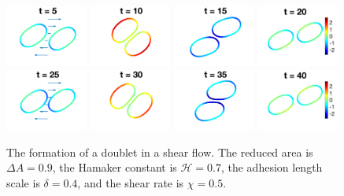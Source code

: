 \documentclass[prf,superscriptaddress,showpacs]{revtex4-1}
\begin{document}
\begin{figure}[htp]
  \includegraphics[width=0.24\textwidth]{figs/adR4em1adS7em1Chi5em1_ra090_image01.png}
  \includegraphics[width=0.24\textwidth]{figs/adR4em1adS7em1Chi5em1_ra090_image02.png}
  \includegraphics[width=0.24\textwidth]{figs/adR4em1adS7em1Chi5em1_ra090_image03.png}
  \includegraphics[width=0.24\textwidth]{figs/adR4em1adS7em1Chi5em1_ra090_image04.png}
  \includegraphics[width=0.24\textwidth]{figs/adR4em1adS7em1Chi5em1_ra090_image05.png}
  \includegraphics[width=0.24\textwidth]{figs/adR4em1adS7em1Chi5em1_ra090_image06.png}
  \includegraphics[width=0.24\textwidth]{figs/adR4em1adS7em1Chi5em1_ra090_image07.png}
  \includegraphics[width=0.24\textwidth]{figs/adR4em1adS7em1Chi5em1_ra090_image08.png}
  \caption{\label{fig:doublet090} The formation of a doublet in a shear
  flow.  The reduced area is $\Delta A = 0.9$, the Hamaker constant is
  $\mathcal{H}=0.7$, the adhesion length scale is $\delta = 0.4$, and
  the shear rate is $\chi=0.5$.}
\end{figure}
\end{document}
